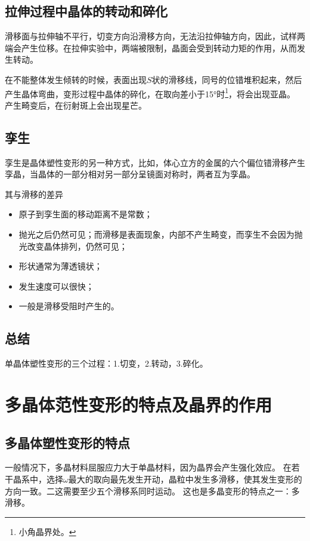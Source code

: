         \subsection{拉伸过程中晶体的转动和碎化}
            滑移面与拉伸轴不平行，切变方向沿滑移方向，无法沿拉伸轴方向，因此，试样两端会产生位移。在拉伸实验中，两端被限制，晶面会受到转动力矩的作用，从而发生转动。

            在不能整体发生倾转的时候，表面出现$S$状的滑移线，同号的位错堆积起来，然后产生晶体弯曲，变形过程中晶体的碎化，在取向差小于\ang{15}时\footnote{小角晶界处。}，将会出现亚晶。
            产生畸变后，在衍射斑上会出现星芒。
        \subsection{孪生}
            孪生是晶体塑性变形的另一种方式，比如，体心立方的金属的六个偏位错滑移产生孪晶，当晶体的一部分相对另一部分呈镜面对称时，两者互为孪晶。
            
            其与滑移的差异
            \begin{itemize}
                \item[1] 原子到孪生面的移动距离不是常数；
                \item[2] 抛光之后仍然可见；而滑移是表面现象，内部不产生畸变，而孪生不会因为抛光改变晶体排列，仍然可见；
                \item[3] 形状通常为薄透镜状；
                \item[4] 发生速度可以很快；
                \item[5] 一般是滑移受阻时产生的。
            \end{itemize}
        \subsection{总结}
            单晶体塑性变形的三个过程：1.切变，2.转动，3.碎化。
    \section{多晶体范性变形的特点及晶界的作用}
        \subsection{多晶体塑性变形的特点}
            一般情况下，多晶材料屈服应力大于单晶材料，因为晶界会产生强化效应。
            在若干晶系中，选择$\omega$最大的取向最先发生开动，晶粒中发生多滑移，使其发生变形的方向一致。二这需要至少五个滑移系同时运动。
            这也是多晶变形的特点之一：多滑移。

